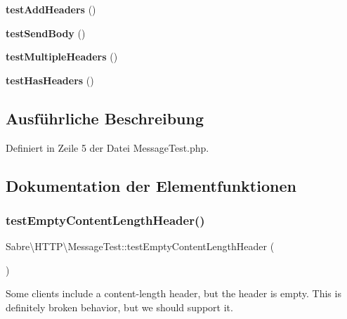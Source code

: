 \begin{DoxyCompactItemize}
{\bfseries test\+Add\+Headers} ()
\item 
\mbox{\label{class_sabre_1_1_h_t_t_p_1_1_message_test_a4586496f532401a26d659d18c806331b}} 
{\bfseries test\+Send\+Body} ()
\item 
\mbox{\label{class_sabre_1_1_h_t_t_p_1_1_message_test_acdf6a5d08be418159a6ec088a2bec368}} 
{\bfseries test\+Multiple\+Headers} ()
\item 
\mbox{\label{class_sabre_1_1_h_t_t_p_1_1_message_test_a302fdbaf64dbc3f763996840f5f132eb}} 
{\bfseries test\+Has\+Headers} ()
\end{DoxyCompactItemize}


\subsection{Ausführliche Beschreibung}


Definiert in Zeile 5 der Datei Message\+Test.\+php.



\subsection{Dokumentation der Elementfunktionen}
\mbox{\label{class_sabre_1_1_h_t_t_p_1_1_message_test_a8146b819d21301f25c122531de0da6c3}} 
\subsubsection{\texorpdfstring{test\+Empty\+Content\+Length\+Header()}{testEmptyContentLengthHeader()}}
{\footnotesize\ttfamily Sabre\textbackslash{}\+H\+T\+T\+P\textbackslash{}\+Message\+Test\+::test\+Empty\+Content\+Length\+Header (\begin{DoxyParamCaption}{ }\end{DoxyParamCaption})}

Some clients include a content-\/length header, but the header is empty. This is definitely broken behavior, but we should support it. 


